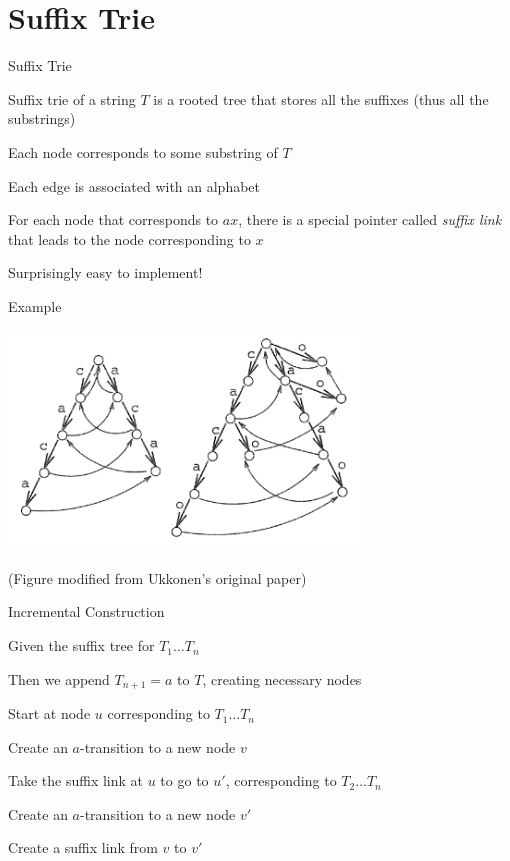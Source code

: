\documentclass[13pt,onlymath]{beamer}
\begin{document}
\section{Suffix Trie}

\begin{frame}{Suffix Trie}
\BIT
\item Suffix trie of a string $T$ is a rooted tree that stores all the suffixes (thus all the substrings)
\item Each node corresponds to some substring of $T$
\item Each edge is associated with an alphabet
\item For each node that corresponds to $ax$, there is a special pointer called \emph{suffix link} that leads to the node corresponding to $x$
\item Surprisingly easy to implement!
\EIT
\end{frame}

\begin{frame}{Example}
\begin{center}
\includegraphics[width=0.7\textwidth]{figures/suftrie}

(Figure modified from Ukkonen's original paper)
\end{center}
\end{frame}

\begin{frame}{Incremental Construction}
\BIT
\item Given the suffix tree for $T_1 \ldots T_n$
\BIT
\item Then we append $T_{n+1} = a$ to $T$, creating necessary nodes
\EIT
\item Start at node $u$ corresponding to $T_1 \ldots T_n$
\BIT
\item Create an $a$-transition to a new node $v$
\EIT
\item Take the suffix link at $u$ to go to $u'$, corresponding to $T_2 \ldots T_n$
\BIT
\item Create an $a$-transition to a new node $v'$
\item Create a suffix link from $v$ to $v'$
\EIT\EIT
\end{frame}
\end{document}
